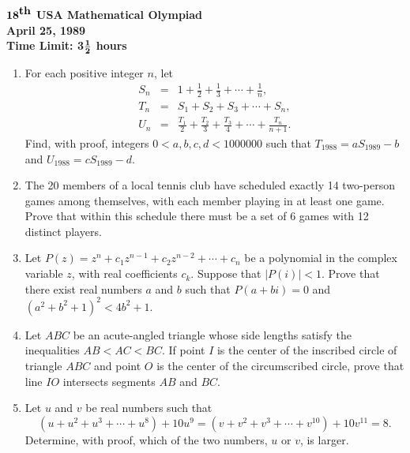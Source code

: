 \def\dg{^\circ}

\begin{center}
${\bf 18}^{\mbox{\bf th}}$ {\bf USA 
Mathematical 
Olympiad} 
\\[.1in] 
{\bf April 25, 1989}\\ 
{\bf Time Limit: 3}${{\bf 1}\over{\bf 2}}$ {\bf 
hours} 
\end{center} 
\begin{enumerate} 
\item
For each positive integer $n$, let
\begin{eqnarray*}
S_n &=& 1 + \frac 12 + \frac 13 + \cdots + \frac 1n, \\
T_n &=& S_1 + S_2 + S_3 + \cdots + S_n, \\
U_n &=& \frac{T_1}{2} + \frac{T_2}{3} + \frac{T_3}{4} + \cdots + 
\frac{T_n}{n+1}.
\end{eqnarray*}
Find, with proof, integers $0 < a, b,c, d < 1000000$ such that $T_{1988} 
= a S_{1989} - b$ and $U_{1988} = c S_{1989} - d$.
\item
The 20 members of a local tennis club have scheduled exactly 14 
two-person games among themselves, with each member playing in at least 
one game. Prove that within this schedule there must be a set of 6 games 
with 12 distinct players.
\item 
Let $P(z)= z^n + c_1 z^{n-1} + c_2 z^{n-2} + \cdots + c_n$ be a 
polynomial in the complex variable $z$, with real coefficients $c_k$. 
Suppose that $|P(i)| < 1$. Prove that there exist real numbers $a$ and 
$b$ such that $P(a + bi) = 0$ and $(a^2 + b^2 + 1)^2 < 4 b^2 + 1$.
\item 
Let $ABC$ be an acute-angled triangle whose side lengths satisfy the 
inequalities $AB < AC < BC$. If point $I$ is the center of the inscribed 
circle of triangle $ABC$ and point $O$ is the center of the circumscribed 
circle, prove that line $IO$ intersects segments $AB$ and $BC$.
\item 
Let $u$ and $v$ be real numbers such that
\[
(u + u^2 + u^3 + \cdots + u^8) + 10u^9 =
(v + v^2 + v^3 + \cdots + v^{10}) + 10v^{11} = 8.
\]
Determine, with proof, which of the two numbers, $u$ or $v$, is larger.
\end{enumerate} 
